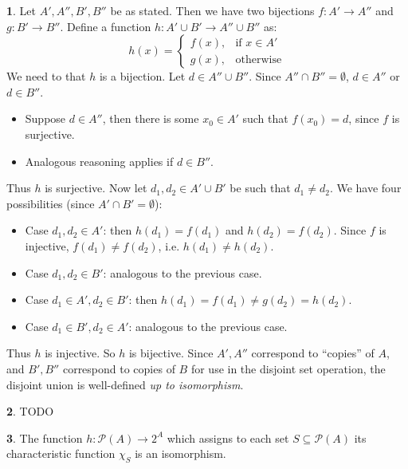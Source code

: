\documentclass{article}
\theoremstyle{definition}
\theoremstyle{definition}
\theoremstyle{definition}
\newtheorem{solution-internal}{}[subsection]
\newenvironment{solution}{
  \medskip
  \begin{solution-internal}
}{
  \end{solution-internal}
}
\begin{document}
\begin{solution}
Let $A', A'', B', B''$ be as stated. Then we have two bijections $f\colon A' \to A''$ and $g\colon B' \to B''$. Define a function $h\colon A' \cup B' \to A'' \cup B''$ as:
\[ h(x) =
\left\{
  \begin{array}{ll}
    f(x), & \text{if $x \in A'$} \\
    g(x), & \text{otherwise}
  \end{array}\right.
\]
We need to that $h$ is a bijection. Let $d \in A'' \cup B''$. Since $A'' \cap B'' = \emptyset$, $d \in A''$ or $d \in B''$.
\begin{itemize}
\item Suppose $d \in A''$, then there is some $x_0 \in A'$ such that $f(x_0) = d$, since $f$ is surjective.
\item Analogous reasoning applies if $d \in B''$.
\end{itemize}
Thus $h$ is surjective. Now let $d_1, d_2 \in A' \cup B'$ be such that $d_1 \neq d_2$. We have four possibilities (since $A' \cap B' = \emptyset$):
\begin{itemize}
\item Case $d_1, d_2 \in A'$: then $h(d_1) = f(d_1)$ and $h(d_2) = f(d_2)$. Since $f$ is injective, $f(d_1) \neq f(d_2)$, i.e. $h(d_1) \neq h(d_2)$.
\item Case $d_1, d_2 \in B'$: analogous to the previous case.
\item Case $d_1 \in A', d_2 \in B'$: then $h(d_1) = f(d_1) \neq g(d_2) = h(d_2)$.
\item Case $d_1 \in B', d_2 \in A'$: analogous to the previous case.
\end{itemize}
Thus $h$ is injective. So $h$ is bijective.
Since $A', A''$ correspond to ``copies'' of $A$, and $B', B''$ correspond to copies of $B$ for use in the disjoint set operation, the disjoint union is well-defined \textit{up to isomorphism}.
\end{solution}

\begin{solution}
  TODO
\end{solution}

\begin{solution}
  The function \(h:\mathcal{P}(A) \to 2^{A}\) which assigns to each set \(S
  \subseteq \mathcal{P}(A)\) its characteristic function \(\chi_{S}\) is an
  isomorphism.
\end{solution}
\end{document}

